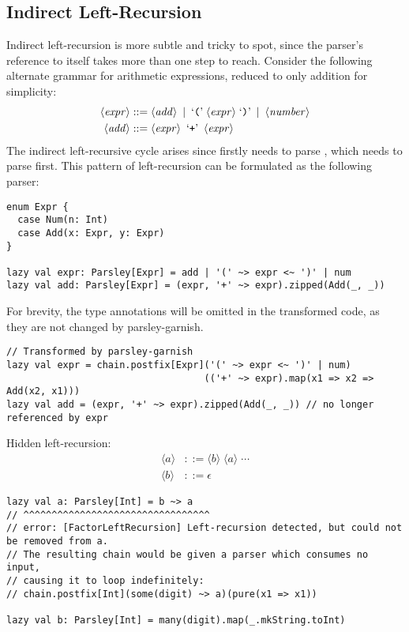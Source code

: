 \documentclass[../../main.tex]{subfiles}
\begin{document}
\subsection{Indirect Left-Recursion}
Indirect left-recursion is more subtle and tricky to spot, since the parser's reference to itself takes more than one step to reach.
Consider the following alternate grammar for arithmetic expressions, reduced to only addition for simplicity:
\begin{align*}
\langle \mathit{expr} \rangle &::= \langle \mathit{add} \rangle \enspace | \enspace \text{`\texttt{(}'} \; \langle \mathit{expr} \rangle \; \text{`\texttt{)}'} \enspace | \enspace \langle \mathit{number} \rangle \\
\langle \mathit{add} \rangle &::= \langle \mathit{expr} \rangle \enspace \text{`\texttt{+}'} \enspace \langle \mathit{expr} \rangle 
\end{align*}
%
The indirect left-recursive cycle arises since  firstly needs to parse , which needs to parse  first.
This pattern of left-recursion can be formulated as the following parser:
\begin{verbatim}
enum Expr {
  case Num(n: Int)
  case Add(x: Expr, y: Expr)
}

lazy val expr: Parsley[Expr] = add | '(' ~> expr <~ ')' | num
lazy val add: Parsley[Expr] = (expr, '+' ~> expr).zipped(Add(_, _))
\end{verbatim}
%
For brevity, the type annotations will be omitted in the transformed code, as they are not changed by parsley-garnish.
\begin{verbatim}
// Transformed by parsley-garnish
lazy val expr = chain.postfix[Expr]('(' ~> expr <~ ')' | num)
                                   (('+' ~> expr).map(x1 => x2 => Add(x2, x1)))
lazy val add = (expr, '+' ~> expr).zipped(Add(_, _)) // no longer referenced by expr
\end{verbatim}

Hidden left-recursion:
\begin{align*}
\langle \mathit{a} \rangle &::= \langle \mathit{b} \rangle \; \langle \mathit{a} \rangle \; \dotsb \\
\langle \mathit{b} \rangle &::= \epsilon
\end{align*}

\begin{verbatim}
lazy val a: Parsley[Int] = b ~> a
// ^^^^^^^^^^^^^^^^^^^^^^^^^^^^^^^^^
// error: [FactorLeftRecursion] Left-recursion detected, but could not be removed from a.
// The resulting chain would be given a parser which consumes no input,
// causing it to loop indefinitely:
// chain.postfix[Int](some(digit) ~> a)(pure(x1 => x1))

lazy val b: Parsley[Int] = many(digit).map(_.mkString.toInt)
\end{verbatim}
\end{document}

